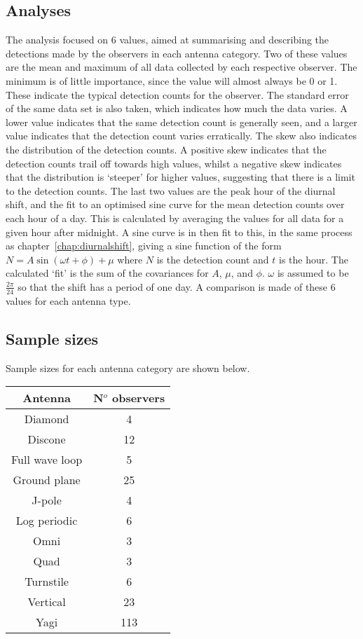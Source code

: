 \subsection{Analyses}
The analysis focused on 6 values, aimed at summarising and describing the detections made by the observers in each antenna category. Two of these values are the mean and maximum of all data collected by each respective observer. The minimum is of little importance, since the value will almost always be 0 or 1. These indicate the typical detection counts for the observer. The standard error of the same data set is also taken, which indicates how much the data varies. A lower value indicates that the same detection count is generally seen, and a larger value indicates that the detection count varies erratically. The skew also indicates the distribution of the detection counts. A positive skew indicates that the detection counts trail off towards high values, whilst a negative skew indicates that the distribution is `steeper' for higher values, suggesting that there is a limit to the detection counts. The last two values are the peak hour of the diurnal shift, and the fit to an optimised sine curve for the mean detection counts over each hour of a day. This is calculated by averaging the values for all data for a given hour after midnight. A sine curve is in then fit to this, in the same process as chapter~\ref{chap:diurnalshift}, giving a sine function of the form $N = A \sin \left( \omega t + \phi \right) + \mu$ where $N$ is the detection count and $t$ is the hour. The calculated `fit' is the sum of the covariances for $A$, $\mu$, and $\phi$. $\omega$ is assumed to be $\frac{2\pi}{24}$ so that the shift has a period of one day. A comparison is made of these 6 values for each antenna type.
\subsection{Sample sizes}
Sample sizes for each antenna category are shown below.
\begin{table}[h!]
	\begin{tabular}{cc}
		\hline
		Antenna & N$^o$ observers \\ \hline
		Diamond & 4 \\
		Discone & 12 \\
		Full wave loop & 5 \\
		Ground plane & 25 \\
		J-pole & 4 \\
		Log periodic & 6 \\
		Omni & 3 \\
		Quad & 3 \\
		Turnstile & 6 \\
		Vertical & 23 \\
		Yagi & 113 \\
		\hline
	\end{tabular}
\end{table}

